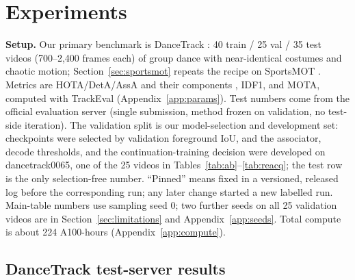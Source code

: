 \documentclass{article} %
\newcommand{\rev}[1]{{\color{blue}#1}}
\begin{document}
\section{Experiments}
\label{sec:experiments}

\textbf{Setup.} Our primary benchmark is DanceTrack \citep{sun2022dancetrack}: 40 train /
25 val / 35 test videos (700--2,400 frames each) of group dance with near-identical costumes
and chaotic motion; Section~\ref{sec:sportsmot} repeats the recipe on SportsMOT
\citep{cui2023sportsmot}. Metrics are HOTA/DetA/AssA and their components \citep{luiten2021hota},
IDF1, and MOTA, computed with TrackEval (Appendix~\ref{app:params}). Test numbers come
from the official evaluation server (single submission, method frozen on validation, no
test-side iteration). The validation split is our model-selection and development set:
checkpoints were selected by validation foreground IoU, and the associator, decode
thresholds, and the continuation-training decision were developed on dancetrack0065, one of
the 25 videos in Tables~\ref{tab:ab}--\ref{tab:reacq}; the test row is the only
selection-free number. ``Pinned'' means fixed in a versioned, released log before the
corresponding run; any later change started a new labelled run. \rev{Main-table numbers
use sampling seed 0; two further seeds on all 25 validation videos are in
Section~\ref{sec:limitations} and Appendix~\ref{app:seeds}.} Total compute is about
\rev{224} A100-hours (Appendix~\ref{app:compute}).

\subsection{DanceTrack test-server results}
\label{sec:main}
\end{document}
